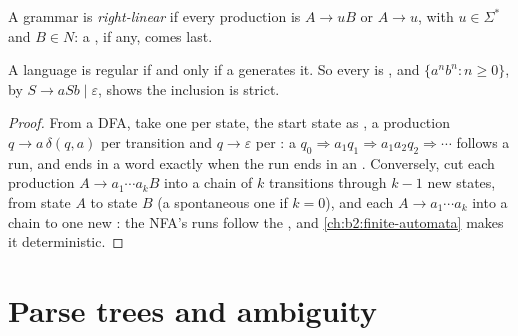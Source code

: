 \begin{definition}\label{def:b2:context-free-languages:right-linear}
A grammar is \emph{right-linear} if every production is $A \to uB$ or $A \to u$, with $u
\in \Sigma^*$ and $B \in N$: a , if any, comes last.
\end{definition}

\begin{proposition}\label{prop:b2:context-free-languages:right-linear}
A language is regular if and only if a  generates it. So every  is ,
and $\{a^nb^n : n \ge 0\}$,  by $S \to aSb \mid \varepsilon$, shows the inclusion is strict.
\end{proposition}

\begin{proof}
From a DFA, take one  per state, the start state as , a production $q \to a\,\delta(q, a)$ per
transition and $q \to \varepsilon$ per : a  $q_0 \Rightarrow a_1 q_1 \Rightarrow a_1 a_2 q_2
\Rightarrow \cdots$ follows a run, and ends in a word exactly when the run ends in an . Conversely,
cut each production $A \to a_1 \cdots a_k B$ into a chain of $k$ transitions through $k - 1$ new states, from state $A$
to state $B$ (a spontaneous one if $k = 0$), and each $A \to a_1 \cdots a_k$ into a chain to one new :
the NFA's runs follow the , and \cref{ch:b2:finite-automata} makes it deterministic.
\end{proof}

\section{Parse trees and ambiguity}\label{sec:b2:context-free-languages:trees}


